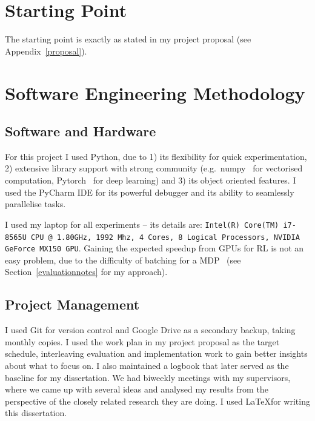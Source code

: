\section{Starting Point}

The starting point is exactly as stated in my project proposal (see Appendix~\ref{proposal}). 


\section{Software Engineering Methodology}





\subsection{Software and Hardware}


For this project I used Python, due to 1) its flexibility for quick experimentation, 2) extensive library support with strong community (e.g.\ numpy~\cite{harris2020numpy} for vectorised computation, Pytorch~\cite{paszke2019pytorch} for deep learning) and 3) its object oriented features. I used the PyCharm IDE for its powerful debugger and its ability to seamlessly parallelise tasks.


I used my laptop for all experiments -- its details are: \texttt{Intel(R) Core(TM) i7-8565U CPU @ 1.80GHz, 1992 Mhz, 4 Cores, 8 Logical Processors, NVIDIA GeForce MX150 GPU}. Gaining the expected speedup from GPUs for RL is not an easy problem, due to the difficulty of batching for a MDP~\cite{stooke2018gpudeepRL} (see Section~\ref{evaluationnotes} for my approach).


\subsection{Project Management}

I used Git for version control and Google Drive as a secondary backup, taking monthly copies. I used the work plan in my project proposal as the target schedule, interleaving evaluation and implementation work to gain better insights about what to focus on. I also maintained a logbook that later served as the baseline for my dissertation. We had biweekly meetings with my supervisors, where we came up with several ideas and analysed my results from the perspective of the closely related research they are doing. I used \LaTeX for writing this dissertation.

